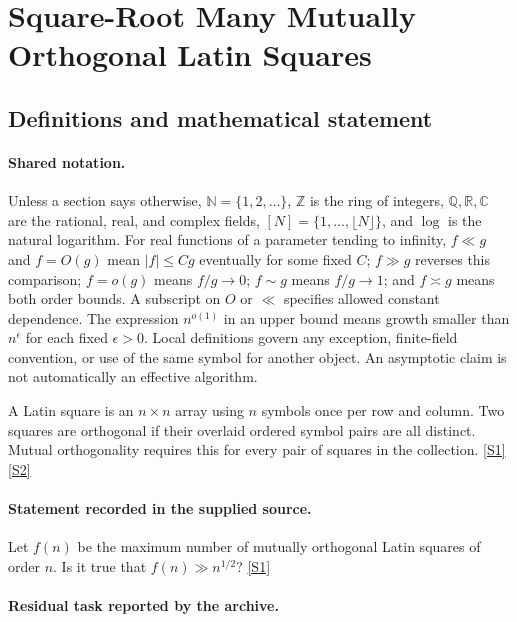 \documentclass[11pt,a4paper]{article}
\newcommand{\N}{\mathbb{N}}
\newcommand{\Z}{\mathbb{Z}}
\newcommand{\Q}{\mathbb{Q}}
\newcommand{\R}{\mathbb{R}}
\newcommand{\C}{\mathbb{C}}
\newcommand{\sref}[2]{\hyperlink{source:#1:#2}{[S#2]}}
\begin{document}
\section{Square-Root Many Mutually Orthogonal Latin Squares}\label{statement}


\subsection{Definitions and mathematical statement}

\paragraph{Shared notation.}Unless a section says otherwise, $\N=\{1,2,\ldots\}$,
$\Z$ is the ring of integers, $\Q,\R,\C$ are the rational, real, and complex
fields, $[N]=\{1,\ldots,\lfloor N\rfloor\}$, and $\log$ is the natural
logarithm. For real functions of a parameter tending to infinity,
$f\ll g$ and $f=O(g)$ mean $|f|\leq Cg$ eventually for some fixed $C$;
$f\gg g$ reverses this comparison; $f=o(g)$ means $f/g\to0$;
$f\sim g$ means $f/g\to1$; and $f\asymp g$ means both order bounds.
A subscript on $O$ or $\ll$ specifies allowed constant dependence.
The expression $n^{o(1)}$ in an upper bound means growth smaller than
$n^\epsilon$ for each fixed $\epsilon>0$. Local definitions govern any
exception, finite-field convention, or use of the same symbol for another
object. An asymptotic claim is not automatically an effective algorithm.



A Latin square is an $n\times n$ array using $n$ symbols once per row and column. Two squares are orthogonal if their overlaid ordered symbol pairs are all distinct. Mutual orthogonality requires this for every pair of squares in the collection. \sref{statement}{1} \sref{statement}{2}

\paragraph{Statement recorded in the supplied source.}
Let $f(n)$ be the maximum number of mutually orthogonal Latin squares of order $n$. Is it true that $ f(n) \gg n^{1/2}? $ \sref{statement}{1}

\paragraph{Residual task reported by the archive.}
\end{document}

